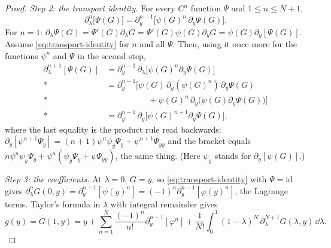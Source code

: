 \begin{proof}
\emph{Step 2: the transport identity.} For every $C^{n}$ function $\Psi$ and $1\le n\le N+1$,
\begin{equation}
 \partial_\lambda^n\bigl[\Psi(G)\bigr]=\partial_y^{n-1}\bigl[\psi(G)^n\,\partial_y\Psi(G)\bigr].
 \label{eq:transport-identity}
\end{equation}
For $n=1$: $\partial_\lambda\Psi(G)=\Psi'(G)\partial_\lambda G=\Psi'(G)\psi(G)\partial_yG=\psi(G)\partial_y[\Psi(G)]$. Assume \eqref{eq:transport-identity} for $n$ and all $\Psi$. Then, using it once more for the functions $\psi^n$ and $\Psi$ in the second step,
\begin{align*}
 \partial_\lambda^{n+1}[\Psi(G)]&=\partial_y^{n-1}\,\partial_\lambda\bigl[\psi(G)^n\partial_y\Psi(G)\bigr]\\*
 &=\partial_y^{n-1}\bigl[\psi(G)\,\partial_y(\psi(G)^n)\,\partial_y\Psi(G)\\*
 &\hspace{5em}+\psi(G)^n\,\partial_y\bigl(\psi(G)\partial_y\Psi(G)\bigr)\bigr]\\*
 &=\partial_y^{n-1}\,\partial_y\bigl[\psi(G)^{n+1}\partial_y\Psi(G)\bigr],
\end{align*}
where the last equality is the product rule read backwards: $\partial_y[\psi^{n+1}\Psi_y]=(n+1)\psi^n\psi_y\Psi_y+\psi^{n+1}\Psi_{yy}$ and the bracket equals $n\psi^n\psi_y\Psi_y+\psi^n(\psi_y\Psi_y+\psi\Psi_{yy})$, the same thing. (Here $\psi_y$ stands for $\partial_y[\psi(G)]$.)

\emph{Step 3: the coefficients.} At $\lambda=0$, $G=y$, so \eqref{eq:transport-identity} with $\Psi=\mathrm{id}$ gives $\partial_\lambda^nG(0,y)=\partial_y^{n-1}[\psi(y)^n]=(-1)^n\partial_y^{n-1}[\varphi(y)^n]$, the Lagrange terms. Taylor's formula in $\lambda$ with integral remainder gives
\[
 g(y)=G(1,y)=y+\sum_{n=1}^N\frac{(-1)^n}{n!}\partial_y^{n-1}[\varphi^n]+\frac1{N!}\int_0^1(1-\lambda)^N\,\partial_\lambda^{N+1}G(\lambda,y)\,\dd\lambda .
\]


\end{proof}
